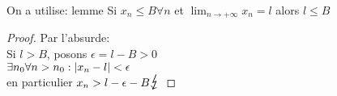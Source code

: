 \documentclass[../main.tex]{subfiles}
\begin{document}
\begin{lemma}
On a utilise: lemme  Si $x_n \leq B \forall n $ et $\lim_{n \to  + \infty} x_n = l$ alors $l \leq B$\\
\end{lemma}
\begin{proof}
Par l'absurde:\\
Si $l > B$, posons $ \epsilon = l - B > 0$\\
$\exists n_0 \forall n >n_0: \left\vert x_n -l\right\vert < \epsilon$\\
en particulier $x_n > l - \epsilon - B \contra$ 
\end{proof}







				
\end{document}
